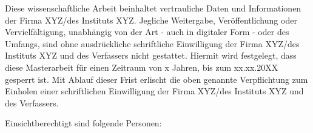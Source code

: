 Diese wissenschaftliche Arbeit beinhaltet vertrauliche Daten und Informationen der Firma XYZ/des Instituts XYZ. Jegliche Weitergabe, Veröffentlichung oder Vervielfältigung, unabhängig von der Art - auch in digitaler Form - oder des Umfangs, sind ohne ausdrückliche schriftliche Einwilligung der Firma XYZ/des Instituts XYZ und des Verfassers nicht gestattet.
Hiermit wird festgelegt, dass diese Masterarbeit für einen Zeitraum von x Jahren, bis zum xx.xx.20XX gesperrt ist. Mit Ablauf dieser Frist erlischt die oben genannte Verpflichtung zum Einholen einer schriftlichen Einwilligung der Firma XYZ/des Instituts XYZ und des Verfassers.\\\vspace{0.25cm}

Einsichtberechtigt sind folgende Personen:\\\vspace{0.25cm}

